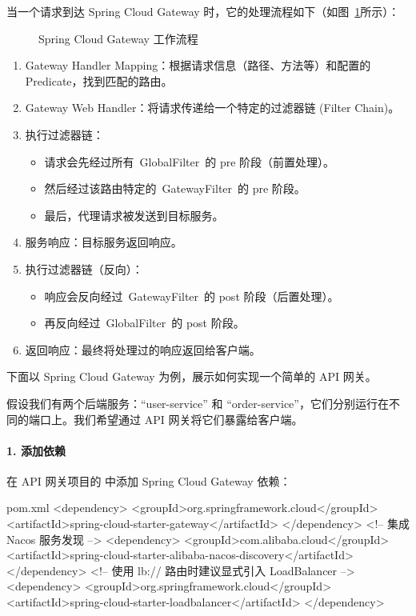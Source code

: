 当一个请求到达 Spring Cloud Gateway 时，它的处理流程如下（如图~\ref{fig:spring-cloud-gateway-workflow}所示）：
\begin{figure}[h]
    \centering
    
    \caption{Spring Cloud Gateway 工作流程}
    \label{fig:spring-cloud-gateway-workflow}
\end{figure}
\begin{enumerate}
    \item Gateway Handler Mapping：根据请求信息（路径、方法等）和配置的 Predicate，找到匹配的路由。
    \item Gateway Web Handler：将请求传递给一个特定的过滤器链 (Filter Chain)。
    \item 执行过滤器链： 
        \begin{itemize}
            \item 请求会先经过所有 GlobalFilter 的 pre 阶段（前置处理）。 
            \item 然后经过该路由特定的 GatewayFilter 的 pre 阶段。
            \item 最后，代理请求被发送到目标服务。
        \end{itemize}
    \item 服务响应：目标服务返回响应。
    \item 执行过滤器链（反向）：
        \begin{itemize}
            \item 响应会反向经过 GatewayFilter 的 post 阶段（后置处理）。 
            \item 再反向经过 GlobalFilter 的 post 阶段。
        \end{itemize}
    \item 返回响应：最终将处理过的响应返回给客户端。
\end{enumerate}



下面以 Spring Cloud Gateway 为例，展示如何实现一个简单的 API 网关。

假设我们有两个后端服务：``user-service'' 和 ``order-service''，它们分别运行在不同的端口上。我们希望通过 API 网关将它们暴露给客户端。
\paragraph{1. 添加依赖}
在 API 网关项目的  中添加 Spring Cloud Gateway 依赖：
\begin{codeblock}[xml]{pom.xml}
<dependency>
    <groupId>org.springframework.cloud</groupId>
    <artifactId>spring-cloud-starter-gateway</artifactId>
</dependency>
<!-- 集成 Nacos 服务发现 -->
<dependency>
    <groupId>com.alibaba.cloud</groupId>
    <artifactId>spring-cloud-starter-alibaba-nacos-discovery</artifactId>
</dependency>
<!-- 使用 lb:// 路由时建议显式引入 LoadBalancer -->
<dependency>
    <groupId>org.springframework.cloud</groupId>
    <artifactId>spring-cloud-starter-loadbalancer</artifactId>
</dependency>
\end{codeblock}

